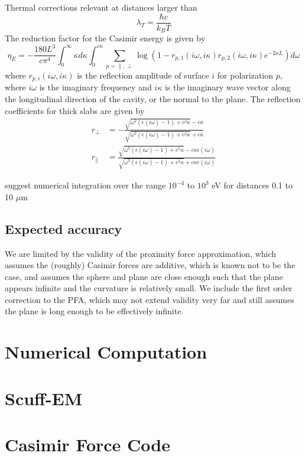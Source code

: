 \documentclass[11pt]{article}
\begin{document}
Thermal corrections relevant at distances larger than 
$$
\lambda_T=\frac{\hbar c}{k_B T}
$$
The reduction factor for the Casimir energy is given by
\begin{equation}
\eta_E=-\frac{180L^3}{c\pi^4}\int^{\infty}_{0}\kappa d\kappa\int^{c\kappa}_0\sum_{p=\parallel,\perp}\log{\left(1-r_{p,1}(i\omega,i\kappa)r_{p,2}(i\omega,i\kappa)e^{-2\kappa L}\right)}d\omega
\end{equation}
where $r_{p,i}(i\omega,i\kappa)$ is the reflection amplitude of surface $i$ for polarization $p$, where $i\omega$ is the imaginary frequency and $i\kappa$ is the imaginary wave vector along the longitudinal direction of the cavity, or the normal to the plane. The reflection coefficients for thick slabs are given by
\begin{align}
r_{\perp}&=-\frac{\sqrt{\omega^2(\epsilon(i\omega)-1)+c^2\kappa}-c\kappa}{\sqrt{\omega^2(\epsilon(i\omega)-1)+c^2\kappa}+c\kappa} \\
r_{\parallel}&=\frac{\sqrt{\omega^2(\epsilon(i\omega)-1)+c^2\kappa}-c\kappa\epsilon(i\omega)}{\sqrt{\omega^2(\epsilon(i\omega)-1)+c^2\kappa}+c\kappa\epsilon(i\omega)}
\end{align}

\citet{Lambrecht} suggest numerical integration over the range $10^{-4}$ to $10^{3}$ eV for distances 0.1 to 10 $\mu$m

\subsection{Expected accuracy}
We are limited by the validity of the proximity force approximation, which assumes the (roughly) Casimir forces are additive, which is known not to be the case, and assumes the sphere and plane are close enough such that the plane appears infinite and the curvature is relatively small. We include the first order correction to the PFA, which may not extend validity very far and still assumes the plane is long enough to be effectively infinite.

\section{Numerical Computation}

\pagebreak
\appendix
\section{Scuff-EM}
\section{Casimir Force Code}



\end{document}
